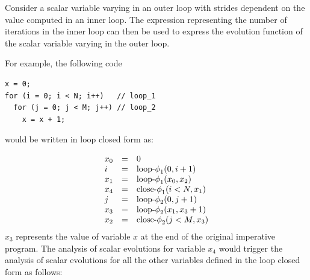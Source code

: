 Consider a scalar variable varying in an outer loop with strides dependent on the value computed in an inner loop. 
The expression representing the number of iterations in the inner loop can then be used to express the evolution function of the scalar
variable varying in the outer loop.

For example, the following code
\begin{verbatim}
x = 0;
for (i = 0; i < N; i++)   // loop_1
  for (j = 0; j < M; j++) // loop_2
    x = x + 1;
\end{verbatim}
would be written in loop closed \SSA{} form as:

\[
\begin{array}{lcl}
  x_0 &=& 0\\
  i &=& \textrm{loop-$\phi$}_1 (0, i + 1)\\
  x_1 &=& \textrm{loop-$\phi$}_1 (x_0, x_2)\\
  x_4 &=& \textrm{close-$\phi$}_1 (i < N, x_1)\\
  j &=& \textrm{loop-$\phi$}_2 (0, j + 1)\\
  x_3 &=& \textrm{loop-$\phi$}_2 (x_1, x_3 + 1)\\
  x_2 &=& \textrm{close-$\phi$}_2 (j < M, x_3)\\
\end{array}
\]
$x_3$ represents the value of variable $x$ at the end of the
original imperative program.  The analysis of scalar evolutions for
variable $x_4$ would trigger the analysis of scalar evolutions for all
the other variables defined in the loop closed \SSA{} form as follows:
